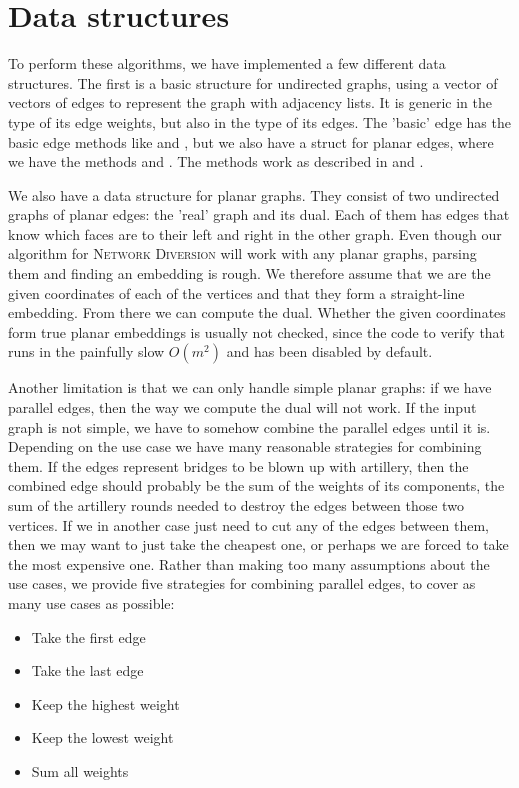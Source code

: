 \section{Data structures}
To perform these algorithms, we have implemented a few different data structures. The first is a basic structure for undirected graphs, using a vector of vectors of edges to represent the graph with adjacency lists. It is generic in the type of its edge weights, but also in the type of its edges. The 'basic' edge has the basic edge methods like  and , but we also have a struct for planar edges, where we have the methods  and . The methods work as described in  and . 

We also have a data structure for planar graphs. They consist of two undirected graphs of planar edges: the 'real' graph and its dual. Each of them has edges that know which faces are to their left and right in the other graph. Even though our algorithm for \textsc{Network Diversion} will work with any planar graphs, parsing them and finding an embedding is rough. We therefore assume that we are the given coordinates of each of the vertices and that they form a straight-line embedding. From there we can compute the dual. Whether the given coordinates form true planar embeddings is usually not checked, since the code to verify that runs in the painfully slow $O(m^2)$ and has been disabled by default.

Another limitation is that we can only handle simple planar graphs: if we have parallel edges, then the way we compute the dual will not work. If the input graph is not simple, we have to somehow combine the parallel edges until it is. Depending on the use case we have many reasonable strategies for combining them. If the edges represent bridges to be blown up with artillery, then the combined edge should probably be the sum of the weights of its components, the sum of the artillery rounds needed to destroy the edges between those two vertices. If we in another case just need to cut any of the edges between them, then we may want to just take the cheapest one, or perhaps we are forced to take the most expensive one. Rather than making too many assumptions about the use cases, we provide five strategies for combining parallel edges, to cover as many use cases as possible: 

\begin{itemize}
    \item Take the first edge
    \item Take the last edge
    \item Keep the highest weight
    \item Keep the lowest weight
    \item Sum all weights
\end{itemize}

